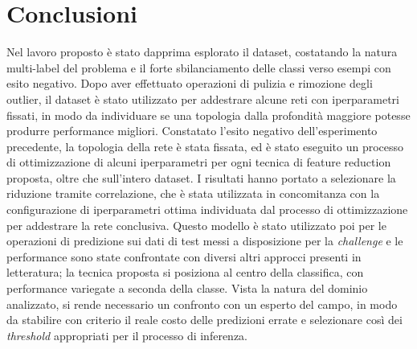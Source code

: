 \section{Conclusioni}
Nel lavoro proposto è stato dapprima esplorato il dataset, costatando la natura multi-label del problema e il forte sbilanciamento delle classi verso esempi con esito negativo. Dopo aver effettuato operazioni di pulizia e rimozione degli outlier, il dataset è stato utilizzato per addestrare alcune reti con iperparametri fissati, in modo da individuare se una topologia dalla profondità maggiore potesse produrre performance migliori. Constatato l'esito negativo dell'esperimento precedente, la topologia della rete è stata fissata, ed è stato eseguito un processo di ottimizzazione di alcuni iperparametri per ogni tecnica di feature reduction proposta, oltre che sull'intero dataset. I risultati hanno portato a selezionare la riduzione tramite correlazione, che è stata utilizzata in concomitanza con la configurazione di iperparametri ottima individuata dal processo di ottimizzazione per addestrare la rete conclusiva. Questo modello è stato utilizzato poi per le operazioni di predizione sui dati di test messi a disposizione per la \textit{challenge} e le performance sono state confrontate con diversi altri approcci presenti in letteratura; la tecnica proposta si posiziona al centro della classifica, con performance variegate a seconda della classe. Vista la natura del dominio analizzato, si rende necessario un confronto con un esperto del campo, in modo da stabilire con criterio il reale costo delle predizioni errate e selezionare così dei \textit{threshold} appropriati per il processo di inferenza.
